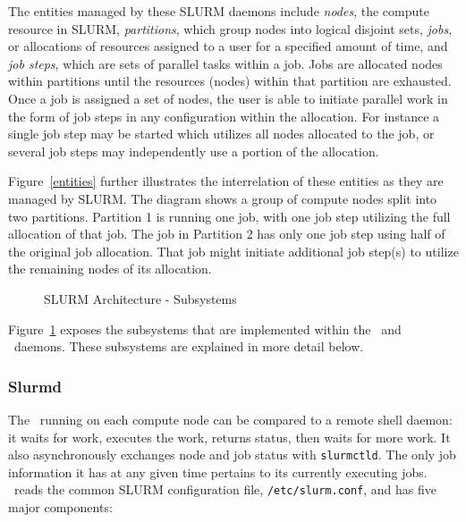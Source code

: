 The entities managed by these SLURM daemons include {\em nodes}, the
compute resource in SLURM, {\em partitions}, which group nodes into
logical disjoint sets, {\em jobs}, or allocations of resources assigned
to a user for a specified amount of time, and {\em job steps}, which are
sets of parallel tasks within a job.  Jobs are allocated nodes within partitions
until the resources (nodes) within that partition are exhausted. Once
a job is assigned a set of nodes, the user is able to initiate
parallel work in the form of job steps in any configuration within the
allocation. For instance a single job step may be started which utilizes
all nodes allocated to the job, or several job steps may independently 
use a portion of the allocation.

Figure~\ref{entities} further illustrates the interrelation of these
entities as they are managed by SLURM. The diagram shows a group of
compute nodes split into two partitions. Partition 1 is running one
job, with one job step utilizing the full allocation of that job.
The job in Partition 2 has only one job step using half of the original
job allocation.
That job might initiate additional job step(s) to utilize 
the remaining nodes of its allocation.

\begin{figure}[tb]
\centerline{}
\caption{SLURM Architecture - Subsystems}
\label{archdetail}
\end{figure}

Figure~\ref{archdetail} exposes the subsystems that are implemented
within the \slurmd\ and \slurmctld\ daemons.  These subsystems
are explained in more detail below.

\subsubsection{Slurmd}

The \slurmd\ running on each compute node can be compared to a remote
shell daemon:  it waits for work, executes the work, returns status,
then waits for more work.  It also asynchronously exchanges node and job
status with {\tt slurmctld}.  The only job information it has at any given time
pertains to its currently executing jobs.
\slurmd\ reads the common SLURM configuration file, {\tt /etc/slurm.conf},
and has five major components:

